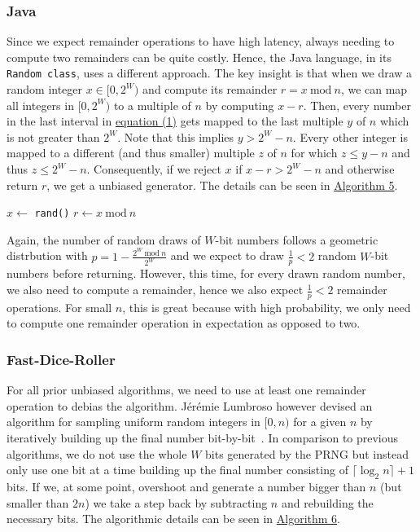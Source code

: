\documentclass[a4paper, UKenglish, cleveref, autoref, thm-restate]{lipics-v2021}
\newcommand{\Mod}[1]{\ \mathrm{mod}\ #1}
\begin{document}
\subsubsection{Java}\label{sec:2.2.2}
Since we expect remainder operations to have high latency, always needing to compute two remainders can be quite costly.
Hence, the Java language, in its \texttt{Random class}, uses a different approach.
The key insight is that when we draw a random integer $x \in [0,2^W)$ and compute its remainder $r = x \Mod n$, we can map all integers in $[0,2^W)$ to a multiple of $n$ by computing $x - r$.
Then, every number in the last interval in \hyperref[eq:1]{equation (1)} gets mapped to the last multiple $y$ of $n$ which is not greater than $2^W$.
Note that this implies $y > 2^W - n$.
Every other integer is mapped to a different (and thus smaller) multiple $z$ of $n$ for which $z \leq y - n$ and thus $z \leq 2^W - n$.
Consequently, if we reject $x$ if $x - r > 2^W - n$ and otherwise return $r$, we get a unbiased generator.
The details can be seen in \hyperref[alg:java]{Algorithm 5}.

\begin{algorithm}[!htb] \label{alg:java}
    \caption{The Java algorithm.}
    \Require{source of uniformly-distributed random integers in $[0,2^W)$ given by \texttt{rand()}}
    $x \leftarrow$ \texttt{rand()}\;
    $r \leftarrow x \Mod n$\;
    \While{$x - r > 2^W - n$}{
        $x \leftarrow$ \texttt{rand()}\;
        $r \leftarrow x \Mod n$\;
    }
    \;
\end{algorithm}

Again, the number of random draws of $W$-bit numbers follows a geometric distrbution with $p = 1 - \frac{2^W \Mod n}{2^W}$ and we expect to draw $\frac{1}{p} < 2$ random $W$-bit numbers before returning.
However, this time, for every drawn random number, we also need to compute a remainder, hence we also expect $\frac{1}{p} < 2$ remainder operations.
For small $n$, this is great because with high probability, we only need to compute one remainder operation in expectation as opposed to two.

\subsubsection{Fast-Dice-Roller}\label{sec:2.2.3}
For all prior unbiased algorithms, we need to use at least one remainder operation to debias the algorithm.
Jérémie Lumbroso however devised an algorithm for sampling uniform random integers in $[0,n)$ for a given $n$ by iteratively building up the final number bit-by-bit~\cite{Flips}.
In comparison to previous algorithms, we do not use the whole $W$ bits generated by the PRNG but instead only use one bit at a time building up the final number consisting of $\lceil\log_2n\rceil + 1$ bits.
If we, at some point, overshoot and generate a number bigger than $n$ (but smaller than $2n$) we take a step back by subtracting $n$ and rebuilding the necessary bits.
The algorithmic details can be seen in \hyperref[alg:flips]{Algorithm 6}.
\end{document}
